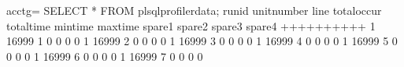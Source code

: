 \documentclass[letterpaper,10pt,english,openany,oneside]{sphinxmanual}
\begin{document}
%
\begin{sphinxVerbatim}[commandchars=\\\{\}]
acctg=\PYGZsh{} SELECT * FROM plsql\PYGZus{}profiler\PYGZus{}data;
runid \textbar{} unit\PYGZus{}number \textbar{} line\PYGZsh{} \textbar{} total\PYGZus{}occur \textbar{} total\PYGZus{}time \textbar{} min\PYGZus{}time \textbar{} max\PYGZus{}time \textbar{} spare1 \textbar{} spare2 \textbar{} spare3 \textbar{} spare4
\PYGZhy{}\PYGZhy{}\PYGZhy{}\PYGZhy{}\PYGZhy{}\PYGZhy{}\PYGZhy{}+\PYGZhy{}\PYGZhy{}\PYGZhy{}\PYGZhy{}\PYGZhy{}\PYGZhy{}\PYGZhy{}\PYGZhy{}\PYGZhy{}\PYGZhy{}\PYGZhy{}\PYGZhy{}\PYGZhy{}+\PYGZhy{}\PYGZhy{}\PYGZhy{}\PYGZhy{}\PYGZhy{}\PYGZhy{}\PYGZhy{}+\PYGZhy{}\PYGZhy{}\PYGZhy{}\PYGZhy{}\PYGZhy{}\PYGZhy{}\PYGZhy{}\PYGZhy{}\PYGZhy{}\PYGZhy{}\PYGZhy{}\PYGZhy{}\PYGZhy{}+\PYGZhy{}\PYGZhy{}\PYGZhy{}\PYGZhy{}\PYGZhy{}\PYGZhy{}\PYGZhy{}\PYGZhy{}\PYGZhy{}\PYGZhy{}\PYGZhy{}\PYGZhy{}+\PYGZhy{}\PYGZhy{}\PYGZhy{}\PYGZhy{}\PYGZhy{}\PYGZhy{}\PYGZhy{}\PYGZhy{}\PYGZhy{}\PYGZhy{}+\PYGZhy{}\PYGZhy{}\PYGZhy{}\PYGZhy{}\PYGZhy{}\PYGZhy{}\PYGZhy{}\PYGZhy{}\PYGZhy{}\PYGZhy{}+\PYGZhy{}\PYGZhy{}\PYGZhy{}\PYGZhy{}\PYGZhy{}\PYGZhy{}\PYGZhy{}\PYGZhy{}+\PYGZhy{}\PYGZhy{}\PYGZhy{}\PYGZhy{}\PYGZhy{}\PYGZhy{}\PYGZhy{}\PYGZhy{}+\PYGZhy{}\PYGZhy{}\PYGZhy{}\PYGZhy{}\PYGZhy{}\PYGZhy{}\PYGZhy{}\PYGZhy{}+\PYGZhy{}\PYGZhy{}\PYGZhy{}\PYGZhy{}\PYGZhy{}\PYGZhy{}\PYGZhy{}\PYGZhy{}
     1 \textbar{}       16999 \textbar{}     1 \textbar{}           0 \textbar{}          0 \textbar{}        0 \textbar{}        0 \textbar{}        \textbar{}        \textbar{}        \textbar{}
     1 \textbar{}       16999 \textbar{}     2 \textbar{}           0 \textbar{}          0 \textbar{}        0 \textbar{}        0 \textbar{}        \textbar{}        \textbar{}        \textbar{}
     1 \textbar{}       16999 \textbar{}     3 \textbar{}           0 \textbar{}          0 \textbar{}        0 \textbar{}        0 \textbar{}        \textbar{}        \textbar{}        \textbar{}
     1 \textbar{}       16999 \textbar{}     4 \textbar{}           0 \textbar{}          0 \textbar{}        0 \textbar{}        0 \textbar{}        \textbar{}        \textbar{}        \textbar{}
     1 \textbar{}       16999 \textbar{}     5 \textbar{}           0 \textbar{}          0 \textbar{}        0 \textbar{}        0 \textbar{}        \textbar{}        \textbar{}        \textbar{}
     1 \textbar{}       16999 \textbar{}     6 \textbar{}           0 \textbar{}          0 \textbar{}        0 \textbar{}        0 \textbar{}        \textbar{}        \textbar{}        \textbar{}
     1 \textbar{}       16999 \textbar{}     7 \textbar{}           0 \textbar{}          0 \textbar{}        0 \textbar{}        0 \textbar{}        \textbar{}        \textbar{}        \textbar{}

\end{sphinxVerbatim}
\end{document}
